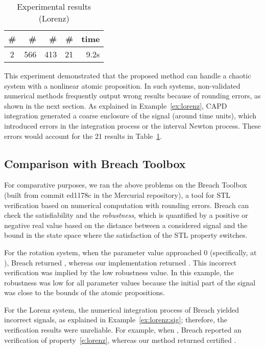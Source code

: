 \documentclass[paper]{ieice}
\begin{document}
\begin{table}[ht]
\begin{center}
	\caption{\label{t:ex:lorenz} Experimental results (Lorenz)} 
    \begin{tabular}{c|r|r|r|r} \hline\hline
		\# & \# & \# & \# & time \\
		\hline
		2 & 566 & 413 & 21 & 9.2s \\
		\hline
	\end{tabular}
\end{center}
\end{table}

This experiment demonstrated that the proposed method can handle a chaotic system with a nonlinear atomic proposition. In such systems, non-validated numerical methods frequently output wrong results because of rounding errors, as shown in the next section.
As explained in Example~\ref{ex:lorenz}, CAPD integration generated a coarse enclosure of the signal (around  time units), which introduced errors in the integration process  or the interval Newton process.
These errors would account for the 21  results in Table~\ref{t:ex:lorenz}.


\subsection{Comparison with Breach Toolbox}

For comparative purposes, we ran the above problems on the Breach Toolbox~\cite{Donze2010a} (built from commit ed1178c in the Mercurial repository), a tool for STL verification based on numerical computation with rounding errors.
Breach can check the satisfiability and the \emph{robustness}, which is quantified by a positive or negative real value based on the distance between a considered signal and the bound in the state space where the satisfaction of the STL property switches.

For the rotation system, when the parameter value  approached 0 (specifically, at ), Breach returned , whereas our implementation returned .
This incorrect verification was implied by the low robustness value.
In this example, the robustness was low for all parameter values because the initial part of the signal was close to the bounds of the atomic propositions.

For the Lorenz system, the numerical integration process of Breach yielded incorrect signals, as explained in Example~\ref{ex:lorenz:sig}; therefore, the verification results were unreliable. 
For example, when , Breach reported an  verification of property~\eqref{e:lorenz}, whereas our method returned certified .
\end{document}
